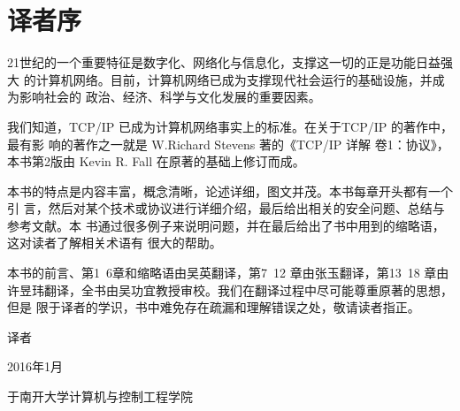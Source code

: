 \chapter*{译者序}

21世纪的一个重要特征是数字化、网络化与信息化，支撑这一切的正是功能日益强大
的计算机网络。目前，计算机网络已成为支撑现代社会运行的基础设施，并成为影响社会的
政治、经济、科学与文化发展的重要因素。

我们知道，TCP/IP 已成为计算机网络事实上的标准。在关于TCP/IP 的著作中，最有影
响的著作之一就是 W.Richard Stevens 著的《TCP/IP 详解 卷1：协议》，本书第2版由 Kevin
R. Fall 在原著的基础上修订而成。

本书的特点是内容丰富，概念清晰，论述详细，图文并茂。本书每章开头都有一个引
言，然后对某个技术或协议进行详细介绍，最后给出相关的安全问题、总结与参考文献。本
书通过很多例子来说明问题，并在最后给出了书中用到的缩略语，这对读者了解相关术语有
很大的帮助。

本书的前言、第1~6章和缩略语由吴英翻译，第7~12 章由张玉翻译，第13~18
章由许昱玮翻译，全书由吴功宜教授审校。我们在翻译过程中尽可能尊重原著的思想，但是
限于译者的学识，书中难免存在疏漏和理解错误之处，敬请读者指正。

\begin{flushright}
    译者
\end{flushright}
\begin{flushright}
    2016年1月
\end{flushright}
\begin{flushright}
    于南开大学计算机与控制工程学院
\end{flushright}